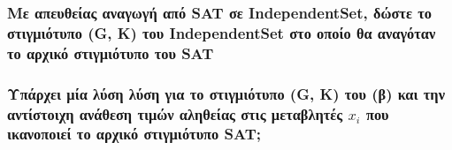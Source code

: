 \subsubsection{Με απευθείας  αναγωγή από SAT σε IndependentSet, δώστε το στιγμιότυπο (G, K) του IndependentSet στο οποίο θα αναγόταν το αρχικό στιγμιότυπο του SAT}
\subsubsection{Υπάρχει μία λύση λύση για το στιγμιότυπο (G, K) του (β) και την αντίστοιχη ανάθεση τιμών αληθείας στις μεταβλητές $x_i$ που ικανοποιεί το αρχικό στιγμιότυπο SAT;}